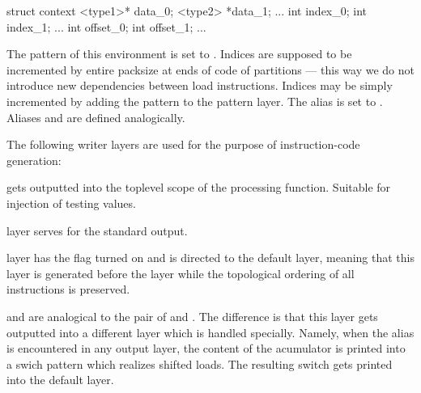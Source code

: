 \mybeginfig
\begin{code}
struct context
{
  <type1>* data_0; <type2> *data_1; ...
  int index_0;     int index_1;  ...
  int offset_0;    int offset_1; ...
}
\end{code}


    The  pattern of this environment is set to . Indices are supposed to be incremented by entire packsize at ends of code of partitions --- this way we do not introduce new dependencies between load instructions. Indices may be simply incremented by adding the  pattern to the  pattern layer. The alias  is set to . Aliases  and  are defined analogically.

    The following writer layers are used for the purpose of instruction-code generation:
    \begin{description}
      \item {} gets outputted into the toplevel scope of the processing function. Suitable for injection of testing values.
      \item {} layer serves for the standard output.
      \item {} layer has the  flag turned on and is directed to the default layer, meaning that this layer is generated before the  layer while the topological ordering of all instructions is preserved.
      \item {} and  are analogical to the pair of  and . The difference is that this layer gets outputted into a different layer which is handled specially. Namely, when the  alias is encountered in any output layer, the content of the acumulator is printed into a swich pattern which realizes shifted loads. The resulting switch gets printed into the default layer.
    \end{description}

